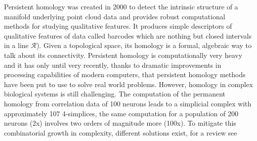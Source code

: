 \documentclass[onecollarge,runningheads]{svjour2}
\begin{document}
Persistent homology was created in 2000 to detect the intrinsic structure of a manifold underlying point cloud data and provides robust computational methods for studying qualitative features. It produces simple descriptors of qualitative features of data called barcodes which are nothing but closed intervals in a line $\mathcal{R}$). Given a topological space, its homology is a formal, algebraic way to talk about its connectivity.
Persistent homology is computationally very heavy and it has only until very recently, thanks to dramatic improvements in processing capabilities of modern computers, that persistent homology methods have been put to use to solve real world problems.
However, homology in complex biological systems is still challenging. The computation of the permanent homology from correlation data of 100 neurons leads to a simplicial complex with approximately 107 4-simplices, the same computation for a population of 200 neurons (2x) involves two orders of magnitude more (100x).
To mitigate this combinatorial growth in complexity, different solutions exist, for a review see \cite{otter2015roadmap}


\end{document}
